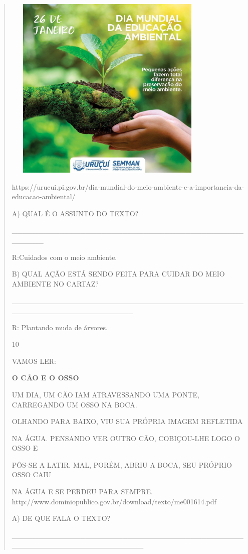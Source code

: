 {{{{\begin{verse}
{{\begin{escolha}
{{{{\includegraphics[width=3.96154in,height=3.50028in]{media/image123.jpeg}

https://urucui.pi.gov.br/dia-mundial-do-meio-ambiente-e-a-importancia-da-educacao-ambiental/

A) QUAL É O ASSUNTO DO TEXTO?

\_\_\_\_\_\_\_\_\_\_\_\_\_\_\_\_\_\_\_\_\_\_\_\_\_\_\_\_\_\_\_\_\_\_\_\_\_\_\_\_\_\_\_\_\_\_\_\_\_\_

R:Cuidados com o meio ambiente.

B) QUAL AÇÃO ESTÁ SENDO FEITA PARA CUIDAR DO MEIO AMBIENTE NO CARTAZ?

\_\_\_\_\_\_\_\_\_\_\_\_\_\_\_\_\_\_\_\_\_\_\_\_\_\_\_\_\_\_\_\_\_\_\_\_\_\_\_\_\_\_\_\_\_\_\_\_\_\_\_\_\_\_\_\_\_\_\_\_\_\_\_\_\_\_\_

R: Plantando muda de árvores.

\num{10}

VAMOS LER:

\textbf{O CÃO E O OSSO}

UM DIA, UM CÃO IAM ATRAVESSANDO UMA PONTE, CARREGANDO UM OSSO NA BOCA.

OLHANDO PARA BAIXO, VIU SUA PRÓPRIA IMAGEM REFLETIDA

NA ÁGUA. PENSANDO VER OUTRO CÃO, COBIÇOU-LHE LOGO O OSSO E

PÔS-SE A LATIR. MAL, PORÉM, ABRIU A BOCA, SEU PRÓPRIO OSSO CAIU

NA ÁGUA E SE PERDEU PARA SEMPRE.
http://www.dominiopublico.gov.br/download/texto/me001614.pdf

A) DE QUE FALA O TEXTO?

\_\_\_\_\_\_\_\_\_\_\_\_\_\_\_\_\_\_\_\_\_\_\_\_\_\_\_\_\_\_\_\_\_\_\_\_\_\_\_\_\_\_\_\_\_\_\_\_\_\_\_\_\_\_\_\_\_\_\_\_\_\_\_\_\_\_\_\_\_

}}}}
\end{escolha}}}
\end{verse}}}}}
